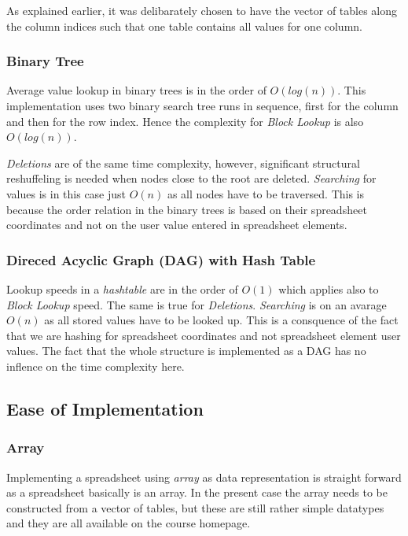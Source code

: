 \documentclass[a4paper,11pt,twoside]{article}
\begin{document}
As explained earlier, it was delibarately chosen to have the vector of tables
along the column indices such that one table contains all values for
one column.

\subsubsection{Binary Tree}
Average value lookup in binary trees is in the order of
$O(log(n))$. This implementation uses two binary search tree runs in
sequence, first for the column and then for the row index. Hence the
complexity for \emph{Block Lookup} is also $O(log(n))$.

\emph{Deletions} are of the same time complexity, however, significant 
structural reshuffeling is needed when nodes close to the root are deleted. 
\emph{Searching} for values is in this case just $O(n)$ as all
nodes have to be traversed. This is because the order relation in the
binary trees is based on their spreadsheet coordinates and not on the user
value entered in spreadsheet elements.




\subsubsection{Direced Acyclic Graph (DAG) with Hash Table}
Lookup speeds in a \textit{hashtable} are in the order of $O(1)$ which
applies also to \emph{Block Lookup} speed. The same is true for
\emph{Deletions}. \emph{Searching} is on an avarage $O(n)$ as all stored values
have to be looked up. This is a consquence of the fact that we are
hashing for spreadsheet coordinates and not spreadsheet element user
values. The fact that the whole structure is implemented as a DAG has
no inflence on the time complexity here. 

\subsection{Ease of Implementation}
\subsubsection{Array}
Implementing a spreadsheet using \textit{array} as data representation
is straight forward as a spreadsheet basically is an array. In the
present case the array needs to be constructed from a vector of
tables, but these are still rather simple datatypes and they are all
available on the course homepage.
\end{document}
